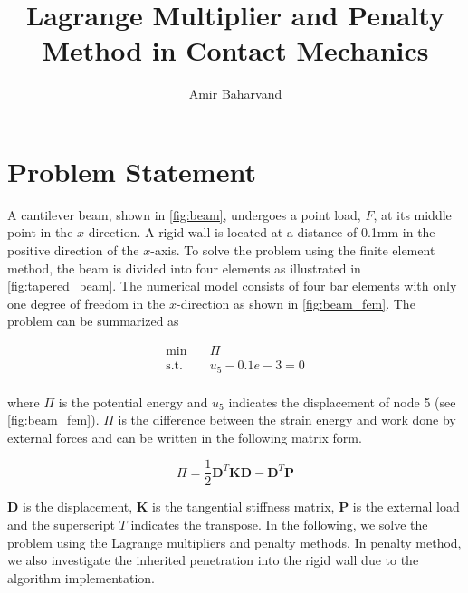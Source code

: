 \documentclass{article}
\title{Lagrange Multiplier and Penalty Method in Contact Mechanics}
\author{Amir Baharvand }
\date{}
\begin{document}
\maketitle

\section{Problem Statement}
 A cantilever beam, shown in \cref{fig:beam}, undergoes a point load, $F$, at its middle point in the $x$-direction. A rigid wall is located at a distance of 0.1mm in the positive direction of the $x$-axis. To solve the problem using the finite element method, the beam is divided into four elements as illustrated in \cref{fig:tapered_beam}. The numerical model consists of four bar elements with only one degree of freedom in the $x$-direction as shown in \cref{fig:beam_fem}. The problem can be summarized as 
 
 \begin{equation}
     \begin{aligned}
    \min \quad & \Pi\\
    \textrm{s.t.} \quad & u_5 - 0.1e-3 = 0\\
    \end{aligned}
    \label{eq:problem}
\end{equation}

where $\Pi$ is the potential energy and $u_5$ indicates the displacement of node 5 (see \cref{fig:beam_fem}). $\Pi$ is the difference between the strain energy and work done by external forces and can be written in the following matrix form.

\begin{equation}
    \Pi = \dfrac{1}{2} \mathbf{D}^{T} \mathbf{K} \mathbf{D} -  \mathbf{D}^{T}  \mathbf{P}
    \label{eq:potential_energy}
\end{equation}

$\mathbf{D}$ is the displacement, $\mathbf{K}$ is the tangential stiffness matrix, $\mathbf{P}$ is the external load and the superscript $T$ indicates the transpose. In the following, we solve the problem using the Lagrange multipliers and penalty methods. In penalty method, we also investigate the inherited penetration into the rigid wall due to the algorithm implementation. 
 
\end{document}
